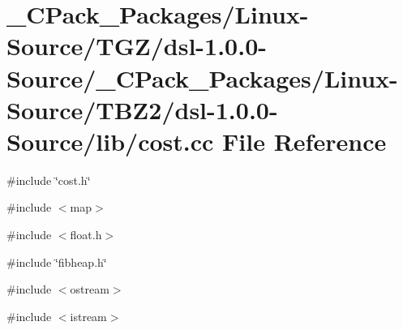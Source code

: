 \section{\_\-CPack\_\-Packages/Linux-\/Source/TGZ/dsl-\/1.0.0-\/Source/\_\-CPack\_\-Packages/Linux-\/Source/TBZ2/dsl-\/1.0.0-\/Source/lib/cost.cc File Reference}
\label{__CPack__Packages_2Linux-Source_2TGZ_2dsl-1_80_80-Source_2__CPack__Packages_2Linux-Source_2TBZ2_6e678deb21d29e7d7048b6c55acba44a}
{\ttfamily \#include \char`\"{}cost.h\char`\"{}}\par
{\ttfamily \#include $<$map$>$}\par
{\ttfamily \#include $<$float.h$>$}\par
{\ttfamily \#include \char`\"{}fibheap.h\char`\"{}}\par
{\ttfamily \#include $<$ostream$>$}\par
{\ttfamily \#include $<$istream$>$}\par
